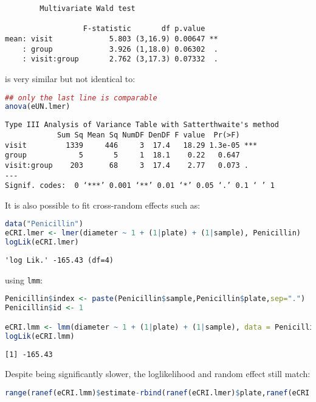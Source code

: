 \documentclass[12pt]{article}
\begin{document}
\label{}
\begin{verbatim}
		Multivariate Wald test 

                  F-statistic       df p.value   
mean: visit             5.803 (3,16.9) 0.00647 **
    : group             3.926 (1,18.0) 0.06302  .
    : visit:group       2.762 (3,17.3) 0.07332  .
\end{verbatim}


is very similar but not identical to:
\begin{lstlisting}[language=r,numbers=none]
## only the last line is comparable
anova(eUN.lmer)
\end{lstlisting}

\label{}
\begin{verbatim}
Type III Analysis of Variance Table with Satterthwaite's method
            Sum Sq Mean Sq NumDF DenDF F value  Pr(>F)    
visit         1339     446     3  17.4   18.29 1.3e-05 ***
group            5       5     1  18.1    0.22   0.647    
visit:group    203      68     3  17.4    2.77   0.073 .  
---
Signif. codes:  0 ‘***’ 0.001 ‘**’ 0.01 ‘*’ 0.05 ‘.’ 0.1 ‘ ’ 1
\end{verbatim}


It is also possible to fit cross-random effects such as:
\begin{lstlisting}[language=r,numbers=none]
data("Penicillin")
eCRI.lmer <- lmer(diameter ~ 1 + (1|plate) + (1|sample), Penicillin)
logLik(eCRI.lmer)
\end{lstlisting}

\label{}
\begin{verbatim}
'log Lik.' -165.43 (df=4)
\end{verbatim}



using \texttt{lmm}:
\begin{lstlisting}[language=r,numbers=none]
Penicillin$index <- paste(Penicillin$sample,Penicillin$plate,sep=".")
Penicillin$id <- 1

eCRI.lmm <- lmm(diameter ~ 1 + (1|plate) + (1|sample), data = Penicillin)
logLik(eCRI.lmm)
\end{lstlisting}

\label{}
\begin{verbatim}
[1] -165.43
\end{verbatim}


Despite being significantly slower, the loglikelihood and random
effect still match:
\begin{lstlisting}[language=r,numbers=none]
range(ranef(eCRI.lmm)$estimate-rbind(ranef(eCRI.lmer)$plate,ranef(eCRI.lmer)$sample))
\end{lstlisting}
\end{document}
